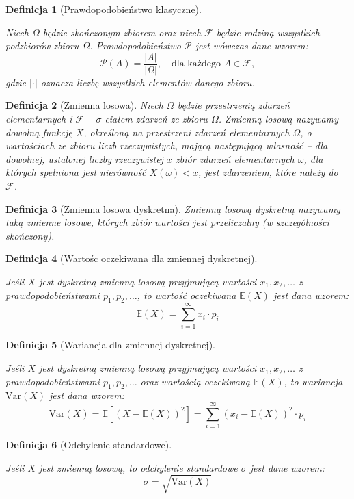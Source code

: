 \documentclass[magisterska]{pracadypl}
\newtheorem{defi}{Definicja}[section]
\begin{document}
\begin{defi}[Prawdopodobieństwo klasyczne]\cite{Statystyka_2} 

Niech $\Omega$ będzie skończonym zbiorem oraz niech $\mathcal {F}$ będzie rodziną wszystkich podzbiorów zbioru $\Omega$. Prawdopodobieństwo $\mathcal{P}$ jest wówczas dane wzorem:
\begin{equation}
\mathcal{P}(A) = \frac{|A|}{|\Omega|}, \quad \text{dla każdego } A \in \mathcal{F},
\label{eq:prawdopodobienstwo_klasyczne}
\end{equation}
gdzie $|\cdot|$ oznacza liczbę wszystkich elementów danego zbioru.

\end{defi}
\begin{defi}[Zmienna losowa]
Niech $\Omega$ będzie przestrzenią zdarzeń elementarnych i $\mathcal {F}$ – $\sigma$-ciałem zdarzeń ze zbioru $\Omega$. Zmienną losową nazywamy dowolną funkcję $X$, określoną na przestrzeni zdarzeń elementarnych $\Omega$, o wartościach ze zbioru liczb rzeczywistych, mającą następującą własność – dla dowolnej, ustalonej liczby rzeczywistej $x$ zbiór zdarzeń elementarnych $\omega$, dla których spełniona jest nierówność $X(\omega) < x$, jest zdarzeniem, które należy do $\mathcal {F}$.
\end{defi}
\begin{defi}[Zmienna losowa dyskretna]
Zmienną losową dyskretną nazywamy taką zmienne losowe, których zbiór wartości jest przeliczalny (w szczególności skończony).
\end{defi}
\begin{defi}[Wartośc oczekiwana dla zmiennej dyskretnej]\cite{Statystyka_1} 

Jeśli \( X \) jest dyskretną zmienną losową przyjmującą wartości \( x_1, x_2, \ldots \) z prawdopodobieństwami \( p_1, p_2, \ldots \), to wartość oczekiwana \( \mathbb{E}(X) \) jest dana wzorem:
\[
\mathbb{E}(X) = \sum_{i=1}^{\infty} x_i \cdot p_i
\]
\end{defi}
\begin{defi}[Wariancja dla zmiennej dyskretnej]\cite{Statystyka_1} 

Jeśli \( X \) jest dyskretną zmienną losową przyjmującą wartości \( x_1, x_2, \ldots \) z prawdopodobieństwami \( p_1, p_2, \ldots \) oraz wartością oczekiwaną \( \mathbb{E}(X) \), to wariancja \( \mathrm{Var}(X) \) jest dana wzorem:
\[
\mathrm{Var}(X) = \mathbb{E}\left[(X - \mathbb{E}(X))^2\right] = \sum_{i=1}^{\infty} (x_i - \mathbb{E}(X))^2 \cdot p_i
\]
\end{defi}
\begin{defi}[Odchylenie standardowe]\cite{Statystyka_1} 

Jeśli \( X \) jest zmienną losową, to odchylenie standardowe \( \sigma \) jest dane wzorem:
\[
\sigma = \sqrt{\mathrm{Var}(X)}
\]
\end{defi}
\end{document}
